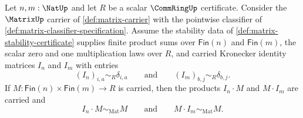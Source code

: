 \begin{theorem}
\label{thm:matrix-identity-multiplication-unit}
Let $n,m:\NatUp$ and let $R$ be a scalar $\CommRingUp$ certificate. Consider
the $\MatrixUp$ carrier of \autoref{def:matrix-carrier} with the pointwise
classifier of \autoref{def:matrix-classifier-specification}. Assume the
stability data of \autoref{def:matrix-stability-certificate} supplies finite
product sums over $\mathsf{Fin}(n)$ and $\mathsf{Fin}(m)$, the scalar zero and
one multiplication laws over $R$, and carried Kronecker identity matrices
$I_n$ and $I_m$ with entries
$$
(I_n)_{i,a}\sim_R\delta_{i,a}
\qquad\text{and}\qquad
(I_m)_{b,j}\sim_R\delta_{b,j}.
$$
If $M:\mathsf{Fin}(n)\times\mathsf{Fin}(m)\to R$ is carried, then the products
$I_n\cdot M$ and $M\cdot I_m$ are carried and
$$
I_n\cdot M\sim_{\mathrm{Mat}} M
\qquad\text{and}\qquad
M\cdot I_m\sim_{\mathrm{Mat}} M.
$$
\end{theorem}
